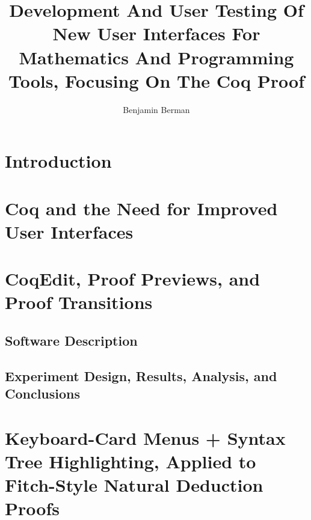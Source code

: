 \documentclass[phd,appendix]{uithesis}
\title{Development And User Testing Of New User Interfaces For Mathematics And Programming Tools, Focusing On The Coq Proof}
\author{Benjamin Berman}
\begin{document}
\frontmatter

\chapter{Introduction}
% 
% 


\chapter{Coq and the Need for Improved User Interfaces}
% 

\chapter{CoqEdit, Proof Previews, and Proof Transitions}

\section{Software Description}

\section{Experiment Design, Results, Analysis, and Conclusions}


\chapter{Keyboard-Card Menus + Syntax Tree Highlighting, Applied to Fitch-Style Natural Deduction Proofs}
\end{document}

